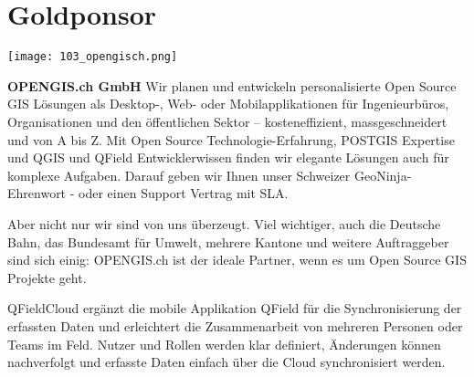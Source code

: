 \section*{Goldponsor}
\begin{flushright}
\texttt{[image: 103\_opengisch.png]}
\end{flushright}
\noindent
{\bfseries OPENGIS.ch GmbH} Wir planen und entwickeln personalisierte Open Source GIS Lösungen als Desktop-, Web- oder Mobilapplikationen für Ingenieurbüros, Organisationen und den öffentlichen Sektor – kosteneffizient, massgeschneidert und von A bis Z. Mit Open Source Technologie-Erfahrung, POSTGIS Expertise und QGIS und QField Entwicklerwissen finden wir elegante Lösungen auch für komplexe Aufgaben. Darauf geben wir Ihnen unser Schweizer GeoNinja-Ehrenwort - oder einen Support Vertrag mit SLA.

\noindent
Aber nicht nur wir sind von uns überzeugt. Viel wichtiger, auch die Deutsche Bahn, das Bundesamt für Umwelt, mehrere Kantone und weitere Auftraggeber sind sich einig: OPENGIS.ch ist der ideale Partner, wenn es um Open Source GIS Projekte geht.

\noindent
QFieldCloud ergänzt die mobile Applikation QField für die Synchronisierung der erfassten Daten und erleichtert die Zusammenarbeit von mehreren Personen oder Teams im Feld. Nutzer und Rollen werden klar definiert, Änderungen können nachverfolgt und erfasste Daten einfach über die Cloud synchronisiert werden.

